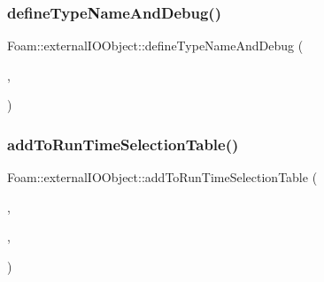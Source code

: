 \subsubsection{\texorpdfstring{define\+Type\+Name\+And\+Debug()}{defineTypeNameAndDebug()}\hspace{0.1cm}{\footnotesize\ttfamily [4/4]}}
{\footnotesize\ttfamily Foam\+::external\+I\+O\+Object\+::define\+Type\+Name\+And\+Debug (\begin{DoxyParamCaption}\item[{\hyperlink{classFoam_1_1externalIOObject_1_1extSensor}{ext\+Sensor}}]{,  }\item[{0}]{ }\end{DoxyParamCaption})}

\mbox{\label{namespaceFoam_1_1externalIOObject_abd8cbdf792d2ab5074f4a2558bd0a720}} 
\subsubsection{\texorpdfstring{add\+To\+Run\+Time\+Selection\+Table()}{addToRunTimeSelectionTable()}\hspace{0.1cm}{\footnotesize\ttfamily [4/4]}}
{\footnotesize\ttfamily Foam\+::external\+I\+O\+Object\+::add\+To\+Run\+Time\+Selection\+Table (\begin{DoxyParamCaption}\item[{\hyperlink{classFoam_1_1externalIOObject_1_1externalIOObject}{external\+I\+O\+Object}}]{,  }\item[{\hyperlink{classFoam_1_1externalIOObject_1_1extSensor}{ext\+Sensor}}]{,  }\item[{dictionary}]{ }\end{DoxyParamCaption})}

